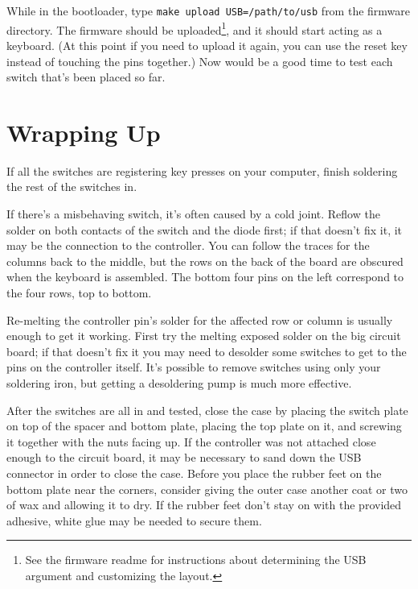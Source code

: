 \documentclass{article}
\begin{document}
\vspace{1em}

While in the bootloader, type \texttt{make upload USB=/path/to/usb}
from the firmware directory. The firmware should be
uploaded\footnote{See the firmware readme for instructions about
  determining the USB argument and customizing the layout.}, and it
should start acting as a keyboard. (At this point if you need to
upload it again, you can use the reset key instead of touching the
pins together.) Now would be a good time to test each switch that's
been placed so far.

\section{Wrapping Up}

If all the switches are registering key presses on your computer,
finish soldering the rest of the switches in.

\vspace{1em}

If there's a misbehaving switch, it's often caused by a cold
joint. Reflow the solder on both contacts of the switch and the diode
first; if that doesn't fix it, it may be the connection to the
controller. You can follow the traces for the columns back to the
middle, but the rows on the back of the board are obscured when the
keyboard is assembled. The bottom four pins on the left correspond to
the four rows, top to bottom.

\vspace{1em}

Re-melting the controller pin's solder for the affected row or column
is usually enough to get it working. First try the melting exposed
solder on the big circuit board; if that doesn't fix it you may need
to desolder some switches to get to the pins on the controller
itself. It's possible to remove switches using only your soldering
iron, but getting a desoldering pump is much more effective.

\vspace{1em}

After the switches are all in and tested, close the case by placing
the switch plate on top of the spacer and bottom plate, placing the
top plate on it, and screwing it together with the nuts facing up. If the
controller was not attached close enough to the circuit board, it may
be necessary to sand down the USB connector in order to close the
case. Before you place the rubber feet on the bottom plate near the
corners, consider giving the outer case another coat or two of wax and
allowing it to dry. If the rubber feet don't stay on with the provided
adhesive, white glue may be needed to secure them.
\end{document}
